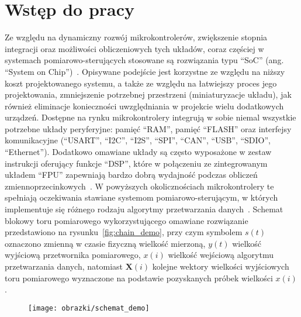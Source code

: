 \chapter{Wstęp do pracy}

Ze względu na dynamiczny rozwój mikrokontrolerów, zwiększenie stopnia integracji oraz możliwości obliczeniowych tych układów, coraz częściej w systemach pomiarowo-sterujących stosowane są rozwiązania typu \enquote{SoC} (ang. \enquote{System on Chip})~\cite{saleh_systemonchip}. Opisywane podejście jest korzystne ze względu na niższy koszt projektowanego systemu, a także ze względu na łatwiejszy proces jego projektowania, zmniejszenie potrzebnej przestrzeni (miniaturyzacje układu), jak również eliminacje konieczności uwzględniania w projekcie wielu dodatkowych urządzeń. Dostępne na rynku mikrokontrolery integrują w sobie niemal wszystkie potrzebne układy peryferyjne: pamięć \enquote{RAM}, pamięć \enquote{FLASH} oraz interfejsy komunikacyjne (\enquote{USART}, \enquote{I2C}, \enquote{I2S}, \enquote{SPI}, \enquote{CAN}, \enquote{USB}, \enquote{SDIO}, \enquote{Ethernet}). Dodatkowo omawiane układy są często wyposażone w zestaw instrukcji oferujący funkcje \enquote{DSP}, które w połączeniu ze zintegrowanym układem \enquote{FPU} zapewniają bardzo dobrą wydajność podczas obliczeń zmiennoprzecinkowych~\cite{reay_dsp}. W powyższych okolicznościach mikrokontrolery te spełniają oczekiwania stawiane systemom pomiarowo-sterującym, w których implementuje się różnego rodzaju algorytmy przetwarzania danych~\cite{saleh_systemonchip}. Schemat blokowy toru pomiarowego wykorzystującego omawiane rozwiązanie przedstawiono na rysunku~\ref{fig:chain_demo}, przy czym symbolem $s(t)$ oznaczono zmienną w czasie fizyczną wielkość mierzoną, $y(t)$ wielkość wyjściową przetwornika pomiarowego, $x(i)$ wielkość wejściową algorytmu przetwarzania danych, natomiast $\mathbf{X}(i)$ kolejne wektory wielkości wyjściowych toru pomiarowego wyznaczone na podstawie pozyskanych próbek wielkości $x(i)$.

\begin{figure}[htb!]
\begin{center}
\texttt{[image: obrazki/schemat\_demo]}
\end{center}
\end{figure}

